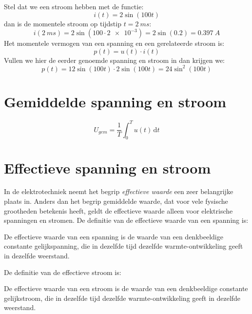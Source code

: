 Stel dat we een stroom hebben met de functie:
%
\begin{equation}
i(t) = 2\sin(100t)
\end{equation}
%
dan is de momentele stroom op tijdstip $t=\SI{2}{ms}$:
%
\begin{equation}
i(\SI{2}{ms}) = 2\sin(100\cdot\num{2e-3}) =2\sin(\num{0.2})=\SI{0.397}{A}
\end{equation}
%
Het momentele vermogen van een spanning en een gerelateerde stroom is:
%
\begin{equation}
p(t) = u(t)\cdot i(t)
\end{equation}
%
Vullen we hier de eerder genoemde spanning en stroom in dan krijgen we:
%
\begin{equation}
p(t) = 12\sin(100t)\cdot2\sin(100t) = 24\sin^2(100t)
\end{equation}
\section{Gemiddelde spanning en stroom}


\begin{equation}
U_{gem} = \dfrac{1}{T}\int_0^Tu(t)\,\mathrm{d}t
\end{equation}

\section{Effectieve spanning en stroom}
In de elektrotechniek neemt het begrip \textsl{effectieve waarde} een zeer belangrijke plaats in.
Anders dan het begrip gemiddelde waarde, dat voor vele fysische grootheden betekenis heeft, geldt de effectieve waarde alleen voor elektrische spanningen en stromen. De definitie van de effectieve waarde van een spanning is:

\begin{displayquote}
De effectieve waarde van een spanning is de waarde van een denkbeeldige constante gelijkspanning, die in dezelfde tijd dezelfde warmte-ontwikkeling geeft in dezelfde weerstand.
\end{displayquote}

De definitie van de effectieve stroom is:

\begin{displayquote}
De effectieve waarde van een stroom is de waarde van een denkbeeldige constante gelijkstroom, die in dezelfde tijd dezelfde warmte-ontwikkeling geeft in dezelfde weerstand.
\end{displayquote}

